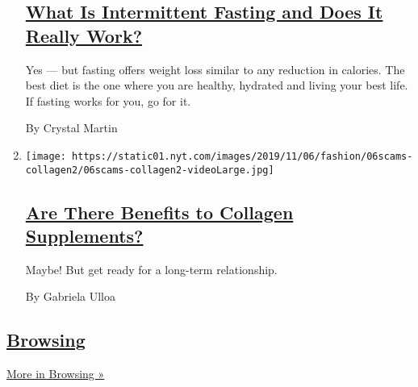 \begin{enumerate}
  \hypertarget{what-is-intermittent-fasting-and-does-it-really-work}{%
  \subsection{\texorpdfstring{\href{/2019/11/23/style/self-care/intermittent-fasting-benefits.html}{What
  Is Intermittent Fasting and Does It Really
  Work?}}{What Is Intermittent Fasting and Does It Really Work?}}\label{what-is-intermittent-fasting-and-does-it-really-work}}

  Yes --- but fasting offers weight loss similar to any reduction in
  calories. The best diet is the one where you are healthy, hydrated and
  living your best life. If fasting works for you, go for it.

  By Crystal Martin
\item
  \texttt{[image: https://static01.nyt.com/images/2019/11/06/fashion/06scams-collagen2/06scams-collagen2-videoLarge.jpg]}

  \hypertarget{are-there-benefits-to-collagen-supplements}{%
  \subsection{\texorpdfstring{\href{/2019/11/09/style/self-care/collagen-benefits.html}{Are
  There Benefits to Collagen
  Supplements?}}{Are There Benefits to Collagen Supplements?}}\label{are-there-benefits-to-collagen-supplements}}

  Maybe! But get ready for a long-term relationship.

  By Gabriela Ulloa
\end{enumerate}

\hypertarget{browsing}{%
\subsection{\texorpdfstring{\href{/column/browsing}{Browsing}}{Browsing}}\label{browsing}}

\href{/column/browsing}{More in Browsing »}

